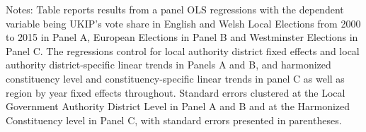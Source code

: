 \documentclass[[a4paper,11pt]{article}
\begin{document}
\begin{table}[h!]
{\begin{threeparttable}
\begin{tabular}{l*{7}{c}}
\bottomrule
\end{tabular}
    \begin{tablenotes} {\footnotesize
\item Notes: Table reports results from a panel OLS regressions with the dependent variable being UKIP's vote share in English and Welsh  Local Elections from 2000 to 2015 in Panel A, European Elections in Panel B and Westminster Elections in Panel C. The regressions control for local authority district fixed effects and local authority district-specific linear trends in Panels A and B, and harmonized constituency level and constituency-specific linear trends in panel C as well as region by year fixed effects throughout. Standard errors clustered at the Local Government Authority District Level in Panel A and B and at the Harmonized Constituency level in Panel C, with standard errors presented in parentheses.} \end{tablenotes}
      \end{threeparttable}
      
 }
      
\end{table}
\end{document}
